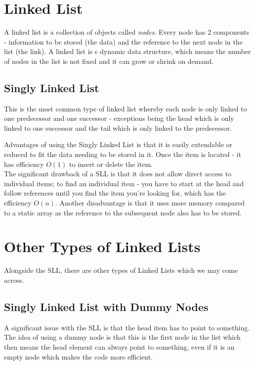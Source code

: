 \section{Linked List}
A linked list is a collection of objects called \textit{nodes}. Every node has 2 components - information to be stored (the data) and the reference to the next node in the list (the link). A linked list is s dynamic data structure, which means the number of nodes in the list is not fixed and it can grow or shrink on demand.
\subsection{Singly Linked List}
This is the most common type of linked list whereby each node is only linked to one predecessor and one successor - exceptions being the head which is only linked to one successor and the tail which is only linked to the predecessor.


Advantages of using the Singly Linked List is that it is easily extendable or reduced to fit the data needing to be stored in it. Once the item is located - it has efficiency $O(1)$ to insert or delete the item.\\

The significant drawback of a SLL is that it does not allow direct access to individual items; to find an individual item - you have to start at the head and follow references until you find the item you're looking for, which has the efficiency $O(n)$. Another disadvantage is that it uses more memory compared to a static array as the reference to the subsequent node also has to be stored.


\section{Other Types of Linked Lists}
Alongside the SLL, there are other types of Linked Lists which we may come across.

\subsection{Singly Linked List with Dummy Nodes}
A significant issue with the SLL is that the head item has to point to something. The idea of using a dummy node is that this is the first node in the list which then means the head element can always point to something, even if it is an empty node which makes the code more efficient. 

